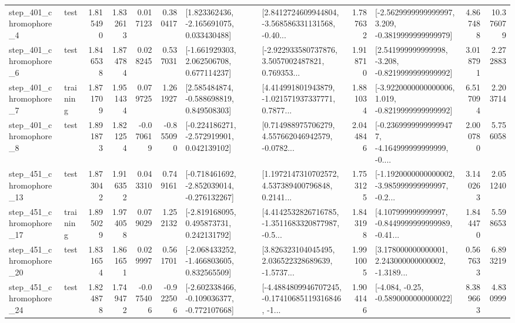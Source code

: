 \begin{tabular}{llrrrrllrlrr}
   step\_401\_chromophore\_4 &      test &      1.815490 &    1.832613 &      0.017123 &  0.380417 &    [1.823362436, -2.165691075, 0.033430488] &  [2.8412724609944804, -3.568586331131568, -0.40... &       1.787632 &  [-2.5629999999999997, 3.209, -0.3819999999999979] &            4.867488 &         10.376079 \\
   step\_401\_chromophore\_6 &      test &      1.846538 &    1.874784 &      0.028245 &  0.537031 &    [-1.661929303, 2.062506708, 0.677114237] &  [-2.922933580737876, 3.5057002487821, 0.769353... &       1.918710 &   [2.541999999999998, -3.208, -0.8219999999999992] &            3.018791 &          2.272883 \\
   step\_401\_chromophore\_7 &  training &      1.871709 &    1.951434 &      0.079725 &  1.261927 &    [2.585484874, -0.588698819, 0.849508303] &  [4.414991801943879, -1.021571937337771, 0.7877... &       1.881034 &  [-3.9220000000000006, 1.019, -0.8219999999999992] &            6.517094 &          2.203714 \\
   step\_401\_chromophore\_8 &      test &      1.891873 &    1.821254 &     -0.070619 & -0.855090 &   [-0.224186271, -2.572919901, 0.042139102] &  [0.714988975706279, 4.557662046942579, -0.0782... &       2.044846 &  [-0.23699999999999477, -4.164999999999999, -0.... &            2.000780 &          5.756058 \\
  step\_451\_chromophore\_13 &      test &      1.873042 &    1.916352 &      0.043310 &  0.749161 &  [-0.718461692, -2.852039014, -0.276132267] &  [1.1972147310702572, 4.537389400796848, 0.2141... &       1.753125 &  [-1.1920000000000002, -3.985999999999997, -0.2... &            3.140263 &          2.051240 \\
  step\_451\_chromophore\_17 &  training &      1.895029 &    1.974058 &      0.079029 &  1.252132 &    [-2.819168095, 0.495873731, 0.242131792] &  [4.4142532826716785, -1.3511683320877987, -0.5... &       1.843198 &  [4.107999999999997, -0.8449999999999989, -0.41... &            1.844470 &          5.598653 \\
  step\_451\_chromophore\_20 &      test &      1.831654 &    1.861651 &      0.029997 &  0.561701 &   [-2.068433252, -1.466803605, 0.832565509] &  [3.826323104045495, 2.036522328689639, -1.5737... &       1.991005 &  [3.178000000000001, 2.243000000000002, -1.3189... &            0.567633 &          6.893219 \\
  step\_451\_chromophore\_24 &      test &      1.824878 &    1.749472 &     -0.075406 & -0.922506 &  [-2.602338466, -0.109036377, -0.772107668] &  [-4.4884809946707245, -0.17410685119316846, -1... &       1.904146 &               [-4.084, -0.25, -0.5890000000000022] &            8.389663 &          4.830999 \\

\end{tabular}

